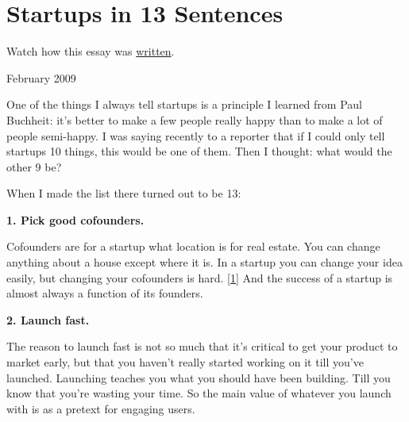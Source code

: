 \chapter{Startups in 13 Sentences}


          
        
          


          
            
              
                


                  
                    
                      
                        
                          Watch how this essay was
                          \href{https://byronm.com/13sentences.html}{written}.
                        
                        

                      
                    
                  
                  
                    February 2009

One of the things I always tell
                    startups is a principle I learned from Paul Buchheit: it's
                    better to make a few people really happy than to make a lot
                    of people semi-happy. I was saying recently to a reporter
                    that if I could only tell startups 10 things, this would be
                    one of them. Then I thought: what would the other 9 be?

When
                    I made the list there turned out to be 13:
                  


                  
                    \textbf{1. Pick good cofounders.}

Cofounders are
                    for a startup what location is for real estate. You can
                    change anything about a house except where it is. In a
                    startup you can change your idea easily, but changing your
                    cofounders is hard.
                    [\href{\#f1n}{1}]
                    And the success of a startup is almost always a function of
                    its founders.

\textbf{2. Launch fast.}

The reason to launch fast is not so much that
                    it's critical to get your product to market early, but that
                    you haven't really started working on it till you've
                    launched. Launching teaches you what you should have been
                    building. Till you know that you're wasting your time. So
                    the main value of whatever you launch with is as a pretext
                    for engaging users.

